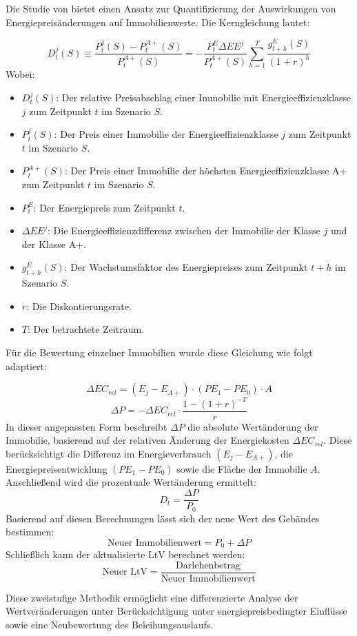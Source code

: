 Die Studie von \parencite{tergerman} bietet einen Ansatz zur Quantifizierung der Auswirkungen von Energiepreisänderungen auf Immobilienwerte. Die Kerngleichung lautet:

\begin{equation}
D^j_t(S) \equiv \frac{P^j_t(S) - P^{A+}_t(S)}{P^{A+}_t(S)} = -\frac{P^E_t \Delta EE^j}{P^{A+}_t(S)} \sum_{h=1}^T \frac{g^E_{t+h}(S)}{(1 + r)^h}
\end{equation}
Wobei:
\begin{itemize}
    \item $D^j_t(S)$: Der relative Preisabschlag einer Immobilie mit Energieeffizienzklasse $j$ zum Zeitpunkt $t$ im Szenario $S$.
    \item $P^j_t(S)$: Der Preis einer Immobilie der Energieeffizienzklasse $j$ zum Zeitpunkt $t$ im Szenario $S$.
    \item $P^{A+}_t(S)$: Der Preis einer Immobilie der höchsten Energieeffizienzklasse A+ zum Zeitpunkt $t$ im Szenario $S$.
    \item $P^E_t$: Der Energiepreis zum Zeitpunkt $t$.
    \item $\Delta EE^j$: Die Energieeffizienzdifferenz zwischen der Immobilie der Klasse $j$ und der Klasse A+.
    \item $g^E_{t+h}(S)$: Der Wachstumsfaktor des Energiepreises zum Zeitpunkt $t+h$ im Szenario $S$.
    \item $r$: Die Diskontierungsrate.
    \item $T$: Der betrachtete Zeitraum.
\end{itemize}
Für die Bewertung einzelner Immobilien wurde diese Gleichung wie folgt adaptiert:

\begin{equation}
    \Delta EC_{rel} = (E_j - E_{A+}) \cdot (PE_1 - PE_0) \cdot A
    \end{equation}
    \begin{equation}
    \Delta P = -\Delta EC_{rel} \cdot \frac{1 - (1 + r)^{-T}}{r}
    \end{equation}
    In dieser angepassten Form beschreibt $\Delta P$ die absolute Wertänderung der Immobilie, basierend auf der relativen Änderung der Energiekosten $\Delta EC_{rel}$. Diese berücksichtigt die Differenz im Energieverbrauch $(E_j - E_{A+})$, die Energiepreisentwicklung $(PE_1 - PE_0)$ sowie die Fläche der Immobilie $A$.
    Anschließend wird die prozentuale Wertänderung ermittelt:
    \begin{equation}
    D_t = \frac{\Delta P}{P_0}
    \end{equation}
    Basierend auf diesen Berechnungen lässt sich der neue Wert des Gebäudes bestimmen:
    \begin{equation}
    \text{Neuer Immobilienwert} = P_0 + \Delta P
    \end{equation}
    Schließlich kann der aktualisierte \ac{LtV} berechnet werden:
    \begin{equation}
    \text{Neuer LtV} = \frac{\text{Darlehenbetrag}}{\text{Neuer Immobilienwert}}
    \end{equation}

Diese zweistufige Methodik ermöglicht eine differenzierte Analyse der Wertveränderungen unter Berücksichtigung unter energiepreisbedingter Einflüsse sowie eine Neubewertung des Beleihungsauslaufs.